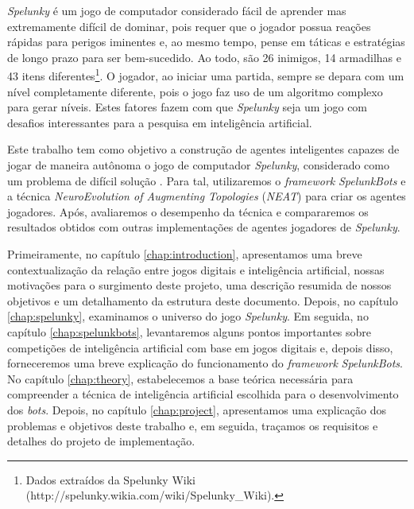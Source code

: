 \textit{Spelunky} é um jogo de computador considerado fácil de aprender mas
extremamente difícil de dominar, pois requer que o jogador possua reações
rápidas para perigos iminentes e, ao mesmo tempo, pense em táticas e estratégias
de longo prazo para ser bem-sucedido. Ao todo, são 26 inimigos, 14 armadilhas e
43 itens diferentes\footnote{Dados extraídos da Spelunky Wiki
(http://spelunky.wikia.com/wiki/Spelunky\_Wiki).}. O jogador, ao iniciar uma
partida, sempre se depara com um nível completamente diferente, pois o jogo faz
uso de um algoritmo complexo para gerar níveis. Estes fatores fazem com que
\textit{Spelunky} seja um jogo com desafios interessantes para a pesquisa em
inteligência artificial.

Este trabalho tem como objetivo a construção de agentes inteligentes capazes de
jogar de maneira autônoma o jogo de computador \textit{Spelunky}, considerado
como um problema de difícil solução \cite{SPELUNKYHARD}.  Para tal, utilizaremos
o \textit{framework} \textit{SpelunkBots} e a técnica \textit{NeuroEvolution of
Augmenting Topologies} (\textit{NEAT}) para criar os agentes jogadores. Após,
avaliaremos o desempenho da técnica e compararemos os resultados obtidos com
outras implementações de agentes jogadores de \textit{Spelunky}.

Primeiramente, no capítulo \ref{chap:introduction}, apresentamos uma breve
contextualização da relação entre jogos digitais e inteligência artificial,
nossas motivações para o surgimento deste projeto, uma descrição resumida de
nossos objetivos e um detalhamento da estrutura deste documento. Depois, no
capítulo \ref{chap:spelunky}, examinamos o universo do jogo \textit{Spelunky}.
Em seguida, no capítulo \ref{chap:spelunkbots}, levantaremos alguns pontos
importantes sobre competições de inteligência artificial com base em jogos
digitais e, depois disso, forneceremos uma breve explicação do funcionamento do
\textit{framework} \textit{SpelunkBots}. No capítulo \ref{chap:theory},
estabelecemos a base teórica necessária para compreender a técnica de
inteligência artificial escolhida para o desenvolvimento dos \textit{bots}.
Depois, no capítulo \ref{chap:project}, apresentamos uma explicação dos
problemas e objetivos deste trabalho e, em seguida, traçamos os requisitos e
detalhes do projeto de implementação.

